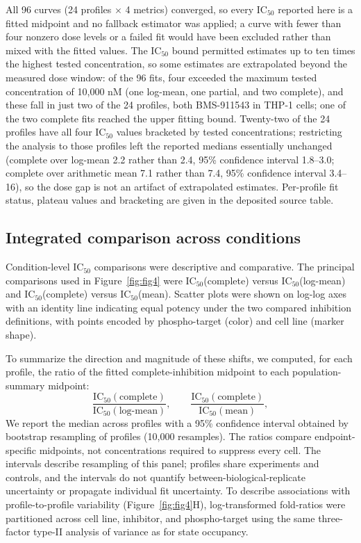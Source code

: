 \documentclass[11pt]{article}
\newcommand{\icfifty}{IC$_{50}$}
\begin{document}
All 96 curves (24 profiles $\times$ 4 metrics) converged, so every \icfifty{} reported here is a fitted midpoint and no fallback estimator was applied; a curve with fewer than four nonzero dose levels or a failed fit would have been excluded rather than mixed with the fitted values. The \icfifty{} bound permitted estimates up to ten times the highest tested concentration, so some estimates are extrapolated beyond the measured dose window: of the 96 fits, four exceeded the maximum tested concentration of 10,000 nM (one log-mean, one partial, and two complete), and these fall in just two of the 24 profiles, both BMS-911543 in THP-1 cells; one of the two complete fits reached the upper fitting bound. Twenty-two of the 24 profiles have all four \icfifty{} values bracketed by tested concentrations; restricting the analysis to those profiles left the reported medians essentially unchanged (complete over log-mean 2.2 rather than 2.4, 95\% confidence interval 1.8--3.0; complete over arithmetic mean 7.1 rather than 7.4, 95\% confidence interval 3.4--16), so the dose gap is not an artifact of extrapolated estimates. Per-profile fit status, plateau values and bracketing are given in the deposited source table.

\subsection*{Integrated comparison across conditions}

Condition-level \icfifty{} comparisons were descriptive and comparative. The principal comparisons used in Figure~\ref{fig:fig4} were \icfifty{}(complete) versus \icfifty{}(log-mean) and \icfifty{}(complete) versus \icfifty{}(mean). Scatter plots were shown on log-log axes with an identity line indicating equal potency under the two compared inhibition definitions, with points encoded by phospho-target (color) and cell line (marker shape).

To summarize the direction and magnitude of these shifts, we computed, for each profile, the ratio of the fitted complete-inhibition midpoint to each population-summary midpoint:
\[
\frac{\mathrm{IC}_{50}(\mathrm{complete})}{\mathrm{IC}_{50}(\mathrm{log\mbox{-}mean})}, \qquad
\frac{\mathrm{IC}_{50}(\mathrm{complete})}{\mathrm{IC}_{50}(\mathrm{mean})},
\]
We report the median across profiles with a 95\% confidence interval obtained by bootstrap resampling of profiles (10{,}000 resamples). The ratios compare endpoint-specific midpoints, not concentrations required to suppress every cell. The intervals describe resampling of this panel; profiles share experiments and controls, and the intervals do not quantify between-biological-replicate uncertainty or propagate individual fit uncertainty. To describe associations with profile-to-profile variability (Figure~\ref{fig:fig4}H), log-transformed fold-ratios were partitioned across cell line, inhibitor, and phospho-target using the same three-factor type-II analysis of variance as for state occupancy.
\end{document}
